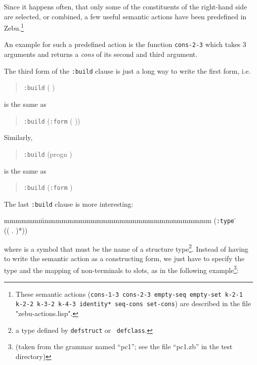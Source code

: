 Since it happens often, that only some of the constituents of the
right-hand side are selected, or combined, a few useful semantic
actions have been predefined in {\sf Zebu}.\footnote{These semantic
  actions ({\tt cons-1-3 cons-2-3 empty-seq empty-set k-2-1 k-2-2
    k-3-2 k-4-3 identity* seq-cons set-cons}) are described in the
  file "zebu-actions.lisp".}

An example for such a predefined action is the function {\tt cons-2-3}
which takes 3 arguments and returns a {\em cons} of its second and
third argument.

The third form of the {\tt :build} clause is just a long way to write
the first form, i.e.
\begin{quote}
 {\tt :build} ( )
\end{quote}

 is the same as
\begin{quote}
 {\tt :build}  ({\tt :form} ( ))
\end{quote}

Similarly,

\begin{quote}
 {\tt :build} (progn )
\end{quote}

 is the same as

\begin{quote}
 {\tt :build} ({\tt :form} )
\end{quote}

The last {\tt :build} clause is more interesting:
\begin{tabbing}
mmmmmm\=mmmmmmmmmmmmmmmmmmmmmmmmmmmmmm\kill
        (\={\tt :type} \= \\
      \>                 \>(( . )*))
\end{tabbing}

where  is a symbol that must be the name of a
structure type\footnote{a type defined by {\tt defstruct} or {\tt
defclass}.}.  Instead of having to write the semantic action as a
constructing form, we just have to specify the type and the mapping of
non-terminals to slots, as in the following example\footnote{(taken
from the grammar named ``pc1''; see the file ``pc1.zb'' in the test
directory)}:

